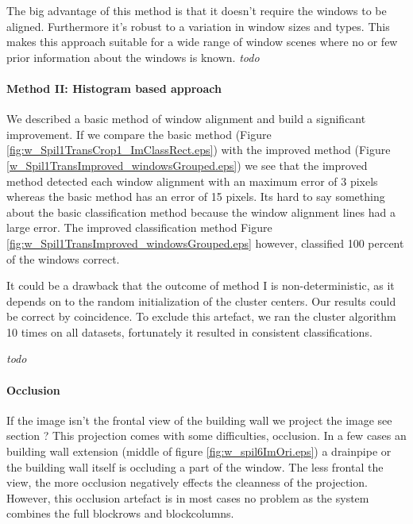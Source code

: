 The big advantage of this method is that it doesn't require the windows to be aligned.
Furthermore it's robust to a variation in window sizes and types. This makes
this approach suitable for a wide range of window scenes where no or few prior
information about the windows is known.
\emph{todo}


\paragraph{Method II: Histogram based approach} 
We described a basic method of window alignment and build a significant improvement.
If we compare the basic method (Figure \ref{fig:w_Spil1TransCrop1_ImClassRect.eps})
with the improved method (Figure \ref{w_Spil1TransImproved_windowsGrouped.eps}) we see that the improved method detected each window alignment with an maximum error of 3 pixels whereas the basic method has an error of 15 pixels.
Its hard to say something about the basic classification method because the window alignment lines had a large error.
The improved classification method Figure \ref{fig:w_Spil1TransImproved_windowsGrouped.eps} however, classified 100 percent of the windows correct.





It could be a drawback that the outcome of method I is non-deterministic, as it depends on to the
random initialization of the cluster centers. Our results could be correct by
coincidence.  To exclude this artefact, we ran the cluster algorithm 10 times on all datasets, fortunately it resulted in consistent classifications.

\emph{todo}\\

\paragraph{Occlusion}
\label{lab:occlusion}
If the image isn't the frontal view of the building wall we project the image 
see section ?%
This projection comes with some difficulties, occlusion.  In a few cases an
building wall extension (middle of figure \ref{fig:w_spil6ImOri.eps}) a drainpipe
or the building wall itself is occluding a part of the window.  The less frontal
the view, the more occlusion negatively effects the cleanness of the projection.
However, this occlusion artefact is in most cases no problem as the system
combines the full blockrows and blockcolumns.  


